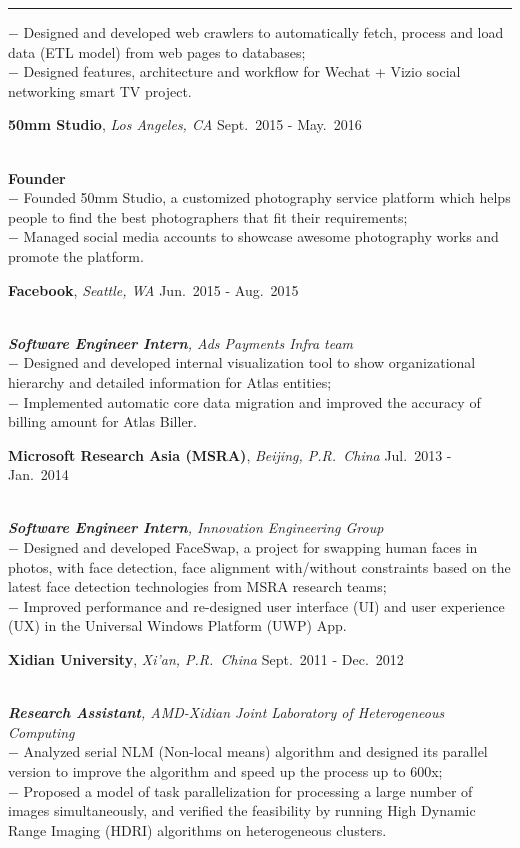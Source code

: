 \documentclass[a4paper,10pt]{article}
\newcommand{\shadedsection}[1]{
    \setlength{\fboxsep}{0pt}
    \colorbox{shadecolor}{%
        \begin{minipage}{\linewidth}%
            \vspace{0.2em}%
            #1%
        \end{minipage}%
    }
}
\newenvironment{rSection}[1]{ %
  \medskip
  \hspace{-1.5em}{\color{Blue}\MakeUppercase{\large \bf {#1}}} %
  \vspace{-0.2em}
  \medskip
  \hrule %
  \begin{list}{}{ %
    \setlength{\leftmargin}{1.5em} %
  }
\setlength{\itemsep}{1pt}
  \item[]
}{
  \end{list}
}
\newcommand{\detail}[1]{{$-$ {#1}}}
\newcommand{\period}[3]{\normalsize {#1} \hfill {#2} - {#3}}
\begin{document}
\begin{rSection}{Experience}
    \detail{Designed and developed web crawlers to automatically fetch, process and load data (ETL model) from web pages to databases;}\\
    \detail{Designed features, architecture and workflow for Wechat + Vizio social networking smart TV project.}
  \item
    \shadedsection{\period{{\bf 50mm Studio}, {\em Los Angeles, CA}}{Sept.~2015}{May.~2016}}\\
    {\bf Founder}\\
    \detail{Founded 50mm Studio, a customized photography service platform which helps people to find the best photographers that fit their requirements;}\\
    \detail{Managed social media accounts to showcase awesome photography works and promote the platform.}
  \item
    \shadedsection{\period{{\bf Facebook}, {\em Seattle, WA}}{Jun.~2015}{Aug.~2015}}\\
    {\em {\bf Software Engineer Intern}, Ads Payments Infra team}\\
    \detail{Designed and developed internal visualization tool to show organizational hierarchy and detailed information for Atlas entities;}\\
    \detail{Implemented automatic core data migration and improved the accuracy of billing amount for Atlas Biller.}
  \item
    \shadedsection{\period{{\bf Microsoft Research Asia (MSRA)}, {\em Beijing, P.R.~China}}{Jul.~2013}{Jan.~2014}}\\
    {\em {\bf Software Engineer Intern}, Innovation Engineering Group}\\
    \detail{Designed and developed FaceSwap, a project for swapping human faces in photos, with face detection, face alignment with/without constraints based on the latest face detection technologies from MSRA research teams;}\\
    \detail{Improved performance and re-designed user interface (UI) and user experience (UX) in the Universal Windows Platform (UWP) App.}
  \item
    \shadedsection{\period{{\bf Xidian University}, {\em Xi'an, P.R.~China}}{Sept.~2011}{Dec.~2012}}\\
    {\em {\bf Research Assistant}, AMD-Xidian Joint Laboratory of Heterogeneous Computing}\\
    \detail{Analyzed serial NLM (Non-local means) algorithm and designed its parallel version to improve the algorithm and speed up the process up to 600x;}\\
    \detail{Proposed a model of task parallelization for processing a large number of images simultaneously, and verified the feasibility by running High Dynamic Range Imaging (HDRI) algorithms on heterogeneous clusters.}
\end{rSection}
\end{document}
